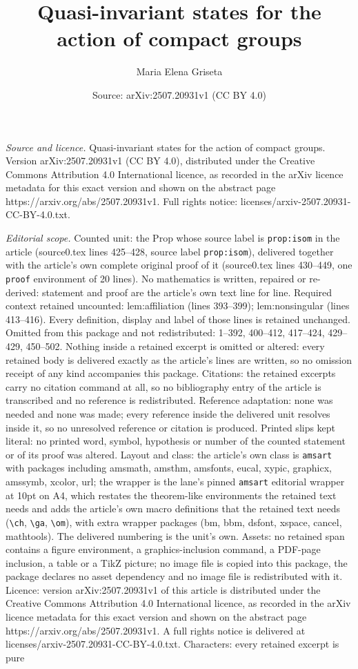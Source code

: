 \documentclass[10pt,a4paper]{amsart}
\title[Quasi-invariant states for the action of compact groups]{Quasi-invariant states for the action of compact groups}
\author{Maria Elena Griseta}
\date{Source: arXiv:2507.20931v1 (CC BY 4.0)}
\begin{document}
\maketitle

\noindent\emph{Source and licence.} Quasi-invariant states for the action of compact groups. Version arXiv:2507.20931v1 (CC BY 4.0), distributed under the Creative Commons Attribution 4.0 International licence, as recorded in the arXiv licence metadata for this exact version and shown on the abstract page https://arxiv.org/abs/2507.20931v1. Full rights notice: licenses/arxiv-2507.20931-CC-BY-4.0.txt.\par\smallskip

\noindent\textit{Editorial scope.} Counted unit: the Prop whose source label is \texttt{prop:isom} in the article (source0.tex lines 425--428, source label \texttt{prop:isom}), delivered together with the article's own complete original proof of it (source0.tex lines 430--449, one \texttt{proof} environment of 20 lines). No mathematics is written, repaired or re-derived: statement and proof are the article's own text line for line. Required context retained uncounted: lem:affiliation (lines 393--399); lem:nonsingular (lines 413--416). Every definition, display and label of those lines is retained unchanged. Omitted from this package and not redistributed: 1--392, 400--412, 417--424, 429--429, 450--502. Nothing inside a retained excerpt is omitted or altered: every retained body is delivered exactly as the article's lines are written, so no omission receipt of any kind accompanies this package. Citations: the retained excerpts carry no citation command at all, so no bibliography entry of the article is transcribed and no reference is redistributed. Reference adaptation: none was needed and none was made; every reference inside the delivered unit resolves inside it, so no unresolved reference or citation is produced. Printed slips kept literal: no printed word, symbol, hypothesis or number of the counted statement or of its proof was altered. Layout and class: the article's own class is \texttt{amsart} with packages including amsmath, amsthm, amsfonts, eucal, xypic, graphicx, amssymb, xcolor, url; the wrapper is the lane's pinned \texttt{amsart} editorial wrapper at 10pt on A4, which restates the theorem-like environments the retained text needs and adds the article's own macro definitions that the retained text needs (\texttt{\textbackslash ch}, \texttt{\textbackslash ga}, \texttt{\textbackslash om}), with extra wrapper packages (bm, bbm, dsfont, xspace, cancel, mathtools). The delivered numbering is the unit's own. Assets: no retained span contains a figure environment, a graphics-inclusion command, a PDF-page inclusion, a table or a TikZ picture; no image file is copied into this package, the package declares no asset dependency and no image file is redistributed with it. Licence: version arXiv:2507.20931v1 of this article is distributed under the Creative Commons Attribution 4.0 International licence, as recorded in the arXiv licence metadata for this exact version and shown on the abstract page https://arxiv.org/abs/2507.20931v1. A full rights notice is delivered at licenses/arxiv-2507.20931-CC-BY-4.0.txt. Characters: every retained excerpt is pure 
\end{document}
